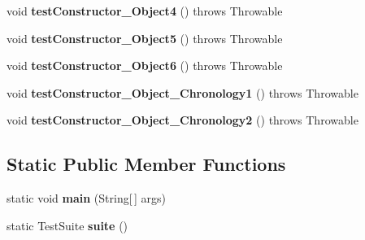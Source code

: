 \begin{DoxyCompactItemize}
\item 
\hypertarget{classorg_1_1joda_1_1time_1_1_test_interval___constructors_a61752a40ac16c8cea9dda0642aaa23cc}{void {\bfseries test\-Constructor\-\_\-\-Object4} ()  throws Throwable }\label{classorg_1_1joda_1_1time_1_1_test_interval___constructors_a61752a40ac16c8cea9dda0642aaa23cc}

\item 
\hypertarget{classorg_1_1joda_1_1time_1_1_test_interval___constructors_adb27e29e2d4b289858e305a162dbe855}{void {\bfseries test\-Constructor\-\_\-\-Object5} ()  throws Throwable }\label{classorg_1_1joda_1_1time_1_1_test_interval___constructors_adb27e29e2d4b289858e305a162dbe855}

\item 
\hypertarget{classorg_1_1joda_1_1time_1_1_test_interval___constructors_a08dfedad22bfb301e94a43d6065185ba}{void {\bfseries test\-Constructor\-\_\-\-Object6} ()  throws Throwable }\label{classorg_1_1joda_1_1time_1_1_test_interval___constructors_a08dfedad22bfb301e94a43d6065185ba}

\item 
\hypertarget{classorg_1_1joda_1_1time_1_1_test_interval___constructors_a8680ed69bba2c87a3d0a2e491fb8fca6}{void {\bfseries test\-Constructor\-\_\-\-Object\-\_\-\-Chronology1} ()  throws Throwable }\label{classorg_1_1joda_1_1time_1_1_test_interval___constructors_a8680ed69bba2c87a3d0a2e491fb8fca6}

\item 
\hypertarget{classorg_1_1joda_1_1time_1_1_test_interval___constructors_aef2a1930fb1b379f63a8ad40d3070bd9}{void {\bfseries test\-Constructor\-\_\-\-Object\-\_\-\-Chronology2} ()  throws Throwable }\label{classorg_1_1joda_1_1time_1_1_test_interval___constructors_aef2a1930fb1b379f63a8ad40d3070bd9}

\end{DoxyCompactItemize}
\subsection*{Static Public Member Functions}
\begin{DoxyCompactItemize}
\item 
\hypertarget{classorg_1_1joda_1_1time_1_1_test_interval___constructors_a038c9b97f85275fa33c1b1966fb38d3c}{static void {\bfseries main} (String\mbox{[}$\,$\mbox{]} args)}\label{classorg_1_1joda_1_1time_1_1_test_interval___constructors_a038c9b97f85275fa33c1b1966fb38d3c}

\item 
\hypertarget{classorg_1_1joda_1_1time_1_1_test_interval___constructors_ab8e5eb539c8f04686748f8083a46ae3c}{static Test\-Suite {\bfseries suite} ()}\label{classorg_1_1joda_1_1time_1_1_test_interval___constructors_ab8e5eb539c8f04686748f8083a46ae3c}

\end{DoxyCompactItemize}
